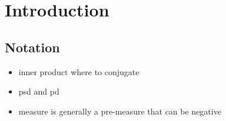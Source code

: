 \chapter*{Introduction}

\section*{Notation}
\begin{itemize}
    \item inner product where to conjugate
    \item psd and pd
    \item measure is generally a pre-measure that can be negative
\end{itemize}